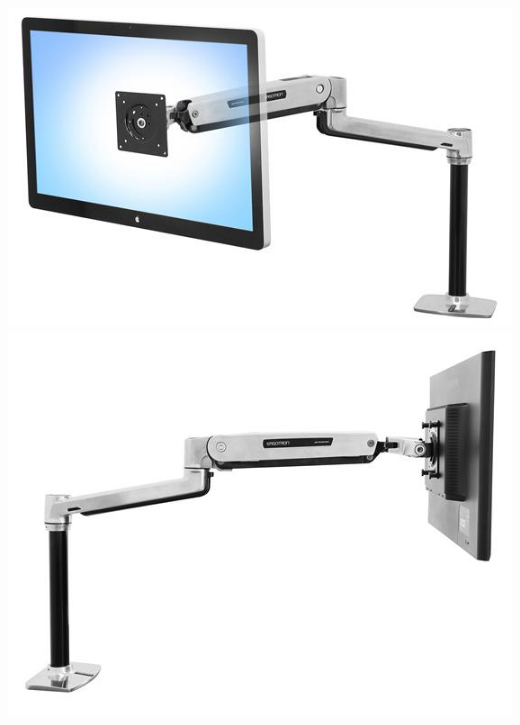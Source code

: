  \begin{minipage}{0.35\textwidth}
 	\includegraphics[width=\linewidth]{figuras/Imagenes_EstadoArte/LX_Sit-Stand_Desk_Arm.jpg}
 	\\ 
 	
 	\includegraphics[width=\linewidth]{figuras/Imagenes_EstadoArte/LX_Sit-Stand_Desk_Arm_2.jpg}
 \end{minipage}
